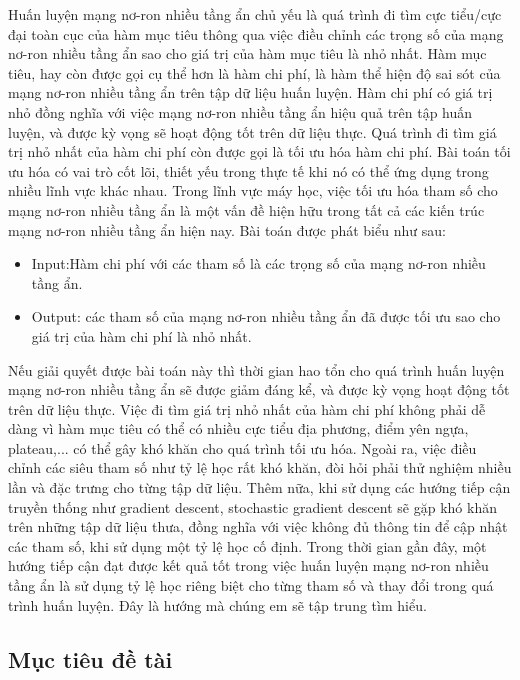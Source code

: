 \documentclass{article}[14pt]
\begin{document}
{  Huấn luyện mạng nơ-ron nhiều tầng ẩn chủ yếu là quá trình đi tìm cực tiểu/cực đại toàn cục của hàm mục tiêu thông qua việc điều chỉnh các trọng số của mạng nơ-ron nhiều tầng ẩn sao cho giá trị của hàm mục tiêu là nhỏ nhất. Hàm mục tiêu, hay còn được gọi cụ thể hơn là hàm chi phí, là hàm thể hiện độ sai sót của mạng nơ-ron nhiều tầng ẩn trên tập dữ liệu huấn luyện. Hàm  chi phí có giá trị nhỏ đồng nghĩa với việc mạng nơ-ron nhiều tầng ẩn hiệu quả trên tập huấn luyện, và được kỳ vọng sẽ hoạt động tốt trên dữ liệu thực. Quá trình đi tìm giá trị nhỏ nhất của hàm chi phí còn được gọi là tối ưu hóa hàm chi phí. Bài toán tối ưu hóa có vai trò cốt lõi, thiết yếu trong thực tế khi nó có thể ứng dụng trong nhiều lĩnh vực khác nhau. Trong lĩnh vực máy học, việc tối ưu hóa tham số cho mạng nơ-ron nhiều tầng ẩn là một vấn đề hiện hữu trong tất cả các kiến trúc mạng nơ-ron nhiều tầng ẩn hiện nay. Bài toán được phát biểu như sau:
   \begin{itemize}
      \item Input:Hàm chi phí với các tham số là các trọng số của mạng nơ-ron nhiều tầng ẩn.
      \item Output: các tham số của mạng nơ-ron nhiều tầng ẩn đã được tối ưu sao cho giá trị của hàm chi phí là nhỏ nhất.
    \end{itemize}
    
   Nếu giải quyết được bài toán này thì thời gian hao tổn cho quá trình huấn luyện mạng nơ-ron nhiều tầng ẩn sẽ được giảm đáng kể, và được kỳ vọng hoạt động tốt trên dữ liệu thực. Việc đi tìm giá trị nhỏ nhất của hàm chi phí không phải dễ dàng vì hàm mục tiêu có thể có nhiều cực tiểu địa phương, điểm yên ngựa, plateau,... có thể gây khó khăn cho quá trình tối ưu hóa. Ngoài ra, việc điều chỉnh các siêu tham số như tỷ lệ học rất khó khăn, đòi hỏi phải thử nghiệm nhiều lần và đặc trưng cho từng tập dữ liệu. Thêm nữa, khi sử dụng các hướng tiếp cận truyền thống như gradient descent, stochastic gradient descent sẽ gặp khó khăn trên những tập dữ liệu thưa, đồng nghĩa với việc không đủ thông tin để cập nhật các tham số, khi sử dụng một tỷ lệ học cố định.
   Trong thời gian gần đây, một hướng tiếp cận đạt được kết quả tốt trong việc huấn luyện mạng nơ-ron nhiều tầng ẩn là sử dụng tỷ lệ học riêng biệt cho từng tham số và thay đổi trong quá trình huấn luyện. Đây là hướng mà chúng em sẽ tập trung tìm hiểu.
    
    \subsection{Mục tiêu đề tài}
    
}
\end{document}
